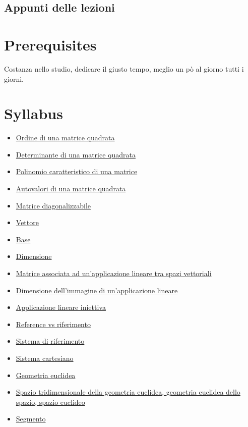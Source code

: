 \documentclass[a4paper,10pt]{article}
\begin{document}
\subsection{Appunti delle lezioni}

\section{Prerequisites}
Costanza nello studio, dedicare il giusto tempo, meglio un pò al giorno tutti i giorni.

\section{Syllabus}
  \begin{itemize}
   \item \href{./OrdineMatrice.html}{Ordine di una matrice quadrata}
   \item \href{./DeterminanteMatrice.html}{Determinante di una matrice quadrata}
   \item \href{./PolinomioMatrice.html}{Polinomio caratteristico di una matrice}
   \item \href{./AutovaloriMatrice.html}{Autovalori di una matrice quadrata}
   \item \href{./MatriceDiagonalizzabile.html}{Matrice diagonalizzabile}
   \item \href{./Vettore.html}{Vettore}
   \item \href{./Base.html}{Base}
   \item \href{./Dimensione.html}{Dimensione}
   \item \href{./MatriceApplicazione.html}{Matrice associata ad un'applicazione lineare tra spazi vettoriali}
   \item \href{./DimensioneImmagine.html}{Dimensione dell'immagine di un'applicazione lineare}
   \item \href{./ApplicazioneIniettiva.html}{Applicazione lineare iniettiva}
   \item \href{./Reference.html}{Reference vs riferimento}
   \item \href{./SistemaRiferimento.html}{Sistema di riferimento}
   \item \href{./SistemaCartesiano.html}{Sistema cartesiano}
   \item \href{./GeometriaEuclidea.html}{Geometria euclidea}
   \item \href{./GeometriaEuclidea3d.html}{Spazio tridimensionale della geometria euclidea, geometria euclidea dello spazio, spazio euclideo}
   \item \href{./Segmento.html}{Segmento}

\end{itemize}
\end{document}
